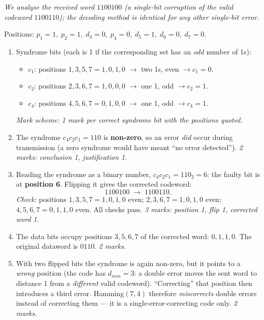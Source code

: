 \documentclass[11pt]{article}
\begin{document}
\begin{corrige}
\emph{We analyse the received word $1100100$ (a single-bit corruption of the valid codeword $1100110$); the decoding method is identical for any other single-bit error.}

Positions: $p_1=1,\; p_2=1,\; d_3=0,\; p_4=0,\; d_5=1,\; d_6=0,\; d_7=0$.
\begin{enumerate}
\item Syndrome bits (each is 1 if the corresponding set has an \emph{odd} number of 1s):
\begin{itemize}
\item $c_1$: positions $1,3,5,7 = 1,0,1,0$ $\rightarrow$ two 1s, even $\rightarrow c_1 = 0$.
\item $c_2$: positions $2,3,6,7 = 1,0,0,0$ $\rightarrow$ one 1, odd $\rightarrow c_2 = 1$.
\item $c_4$: positions $4,5,6,7 = 0,1,0,0$ $\rightarrow$ one 1, odd $\rightarrow c_4 = 1$.
\end{itemize}
\hfill \emph{Mark scheme: 1 mark per correct syndrome bit with the positions quoted.}
\item The syndrome $c_4 c_2 c_1 = 110$ is \textbf{non-zero}, so an error \emph{did} occur during transmission (a zero syndrome would have meant ``no error detected''). \hfill \emph{2 marks: conclusion 1, justification 1.}
\item Reading the syndrome as a binary number, $c_4 c_2 c_1 = 110_2 = 6$: the faulty bit is at \textbf{position 6}. Flipping it gives the corrected codeword:
\[ 1100100 \;\longrightarrow\; \boxed{1100110}. \]
\emph{Check:} positions $1,3,5,7 = 1,0,1,0$ even; $2,3,6,7 = 1,0,1,0$ even; $4,5,6,7 = 0,1,1,0$ even. All checks pass. \hfill \emph{3 marks: position 1, flip 1, corrected word 1.}
\item The data bits occupy positions $3, 5, 6, 7$ of the corrected word: $0, 1, 1, 0$. The original dataword is $\boxed{0110}$. \hfill \emph{2 marks.}
\item With two flipped bits the syndrome is again non-zero, but it points to a \emph{wrong} position (the code has $d_{min}=3$: a double error moves the sent word to distance 1 from a \emph{different} valid codeword). ``Correcting'' that position then introduces a third error. Hamming$(7,4)$ therefore \emph{miscorrects} double errors instead of correcting them — it is a single-error-correcting code only. \hfill \emph{2 marks.}
\end{enumerate}
\end{corrige}
\end{document}
